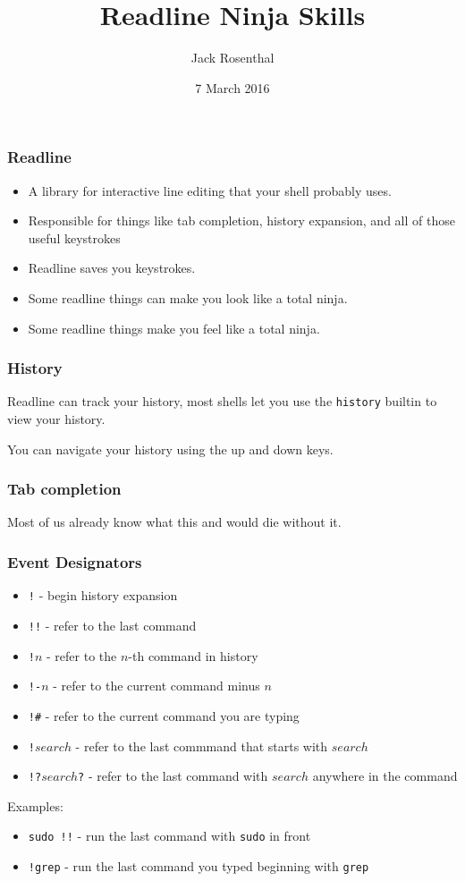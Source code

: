 \documentclass{beamer}
\title{Readline Ninja Skills}
\author{Jack Rosenthal}
\date{7 March 2016}
\begin{document}
\begin{frame}
    \maketitle
\end{frame}
\logo{}

\begin{frame}
    \frametitle{Readline}
    \begin{itemize}[<+->]
        \item A library for interactive line editing that your shell probably uses.
        \item Responsible for things like tab completion, history expansion,
            and all of those useful keystrokes
        \item Readline saves you keystrokes.
        \item Some readline things can make you look like a total ninja.
        \item Some readline things make you feel like a total ninja.
    \end{itemize}
\end{frame}

\begin{frame}
    \frametitle{History}
    Readline can track your history, most shells let you use the
    \texttt{history} builtin to view your history.

    You can navigate your history using the up and down keys.
\end{frame}

\begin{frame}
    \frametitle{Tab completion}
    Most of us already know what this and would die without it.
\end{frame}

\begin{frame}
    \frametitle{Event Designators}
    \begin{itemize}[<+->]
        \item \texttt{!} - begin history expansion
        \item \texttt{!!} - refer to the last command
        \item \texttt{!$n$} - refer to the $n$-th command in history
        \item \texttt{!-$n$} - refer to the current command minus $n$
        \item \texttt{!\#} - refer to the current command you are typing
        \item \texttt{!$search$} - refer to the last commmand that starts with
            $search$
        \item[] \texttt{!?$search$?} - refer to the last command with $search$
            anywhere in the command
    \end{itemize}
    \pause
    Examples:
    \begin{itemize}[<+->]
        \item \texttt{sudo !!} - run the last command with \texttt{sudo} in
            front
        \item \texttt{!grep} - run the last command you typed beginning with
            \texttt{grep}
    \end{itemize}
\end{frame}
\end{document}
